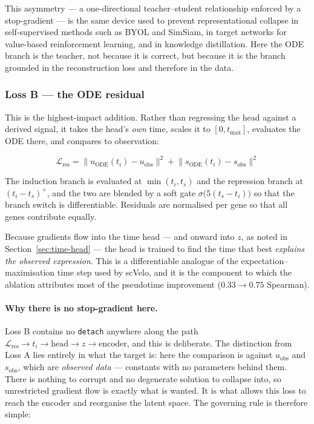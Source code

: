 \documentclass[11pt,a4paper]{article}
\newenvironment{keybox}{\begin{shaded}\noindent}{\end{shaded}}
\newcommand{\uns}{u}
\newcommand{\spl}{s}
\newcommand{\ts}{t_{s}}
\newcommand{\tmax}{t_{\max}}
\theoremstyle{definition}
\begin{document}
This asymmetry --- a one-directional teacher--student relationship enforced by a
stop-gradient --- is the same device used to prevent representational collapse
in self-supervised methods such as BYOL and SimSiam, in target networks for
value-based reinforcement learning, and in knowledge distillation. Here the ODE
branch is the teacher, not because it is correct, but because it is the branch
grounded in the reconstruction loss and therefore in the data.

\subsubsection{Loss B --- the ODE residual}
\label{sec:loss-b}

This is the highest-impact addition. Rather than regressing the head against a
derived signal, it takes the head's \emph{own} time, scales it to
$[0, \tmax]$, evaluates the ODE there, and compares to observation:
%
\begin{keybox}
\begin{equation}
\mathcal{L}_{\text{res}}
= \big\lVert \uns_{\text{ODE}}(t_i) - \uns_{\text{obs}} \big\rVert^2
+ \big\lVert \spl_{\text{ODE}}(t_i) - \spl_{\text{obs}} \big\rVert^2
\label{eq:ode-residual}
\end{equation}
\end{keybox}
%
The induction branch is evaluated at $\min(t_i, \ts)$ and the repression branch
at $(t_i - \ts)^{+}$, and the two are blended by a soft gate
$\sigma\big(5(\ts - t_i)\big)$ so that the branch switch is differentiable.
Residuals are normalised per gene so that all genes contribute equally.

Because gradients flow into the time head --- and onward into $z$, as noted in
Section~\ref{sec:time-head} --- the head is trained to find the time that best
\emph{explains the observed expression}. This is a differentiable analogue of
the expectation--maximisation time step used by scVelo, and it is the component
to which the ablation attributes most of the pseudotime improvement
($0.33 \to 0.75$ Spearman).

\paragraph{Why there is no stop-gradient here.} Loss B contains no
\texttt{detach} anywhere along the path
$\mathcal{L}_{\text{res}} \to t_i \to \text{head} \to z \to \text{encoder}$,
and this is deliberate. The distinction from Loss A lies entirely in what the
target is: here the comparison is against $\uns_{\text{obs}}$ and
$\spl_{\text{obs}}$, which are \emph{observed data} --- constants with no
parameters behind them. There is nothing to corrupt and no degenerate solution
to collapse into, so unrestricted gradient flow is exactly what is wanted. It
is what allows this loss to reach the encoder and reorganise the latent space.
The governing rule is therefore simple:
\end{document}
